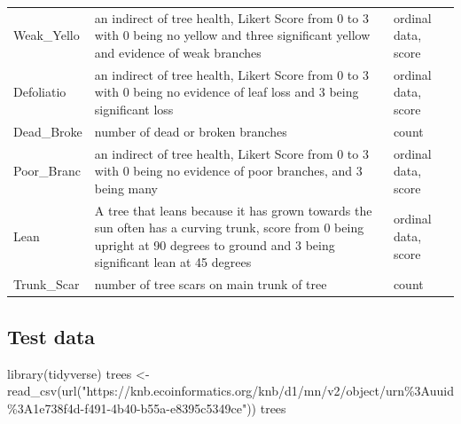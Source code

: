 \documentclass[
]{book}
\newenvironment{Shaded}{\begin{snugshade}}{\end{snugshade}}
\newcommand{\FunctionTok}[1]{\textcolor[rgb]{0.00,0.00,0.00}{#1}}
\newcommand{\NormalTok}[1]{#1}
\newcommand{\OtherTok}[1]{\textcolor[rgb]{0.56,0.35,0.01}{#1}}
\newcommand{\StringTok}[1]{\textcolor[rgb]{0.31,0.60,0.02}{#1}}
\begin{document}
\begin{tabular}{lll}
Weak\_Yello & an indirect of tree health, Likert Score from 0 to 3 with 0 being no yellow and three significant yellow and evidence of weak branches & ordinal data, score\\
Defoliatio & an indirect of tree health, Likert Score from 0 to 3 with 0 being no evidence of leaf loss and 3 being significant loss & ordinal data, score\\
Dead\_Broke & number of dead or broken branches & count\\
Poor\_Branc & an indirect of tree health, Likert Score from 0 to 3 with 0 being no evidence of poor branches, and 3 being many & ordinal data, score\\
\addlinespace
Lean & A tree that leans because it has grown towards the sun often has a curving trunk, score from 0 being upright at 90 degrees to ground and 3 being significant lean at 45 degrees & ordinal data, score\\
Trunk\_Scar & number of tree scars on main trunk of tree & count\\
\bottomrule
\end{tabular}

\hypertarget{test-data}{%
\subsection*{Test data}\label{test-data}}

\begin{Shaded}
\begin{Highlighting}[]
\FunctionTok{library}\NormalTok{(tidyverse)}
\NormalTok{trees }\OtherTok{\textless{}{-}} \FunctionTok{read\_csv}\NormalTok{(}\FunctionTok{url}\NormalTok{(}\StringTok{"https://knb.ecoinformatics.org/knb/d1/mn/v2/object/urn\%3Auuid\%3A1e738f4d{-}f491{-}4b40{-}b55a{-}e8395c5349ce"}\NormalTok{))  }
\NormalTok{trees}
\end{Highlighting}
\end{Shaded}
\end{document}

